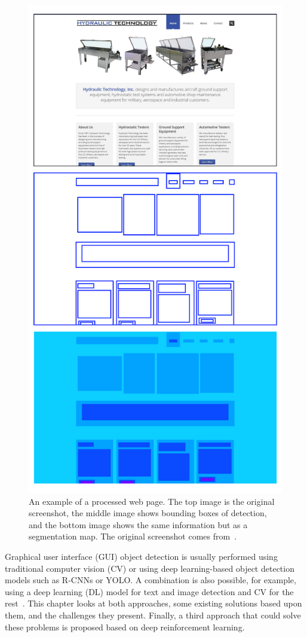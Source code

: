 \documentclass[
  digital,     %
  oneside,     %
  nosansbold,  %
  nocolorbold, %
  lof,         %
  lot,         %
]{fithesis4}
\begin{document}
\begin{figure}
    \centering
    \includegraphics[width=0.7\linewidth]{diagrams/result_example.pdf}
    \caption{An example of a processed web page. The top image is the original screenshot, the middle image shows bounding boxes of detection, and the bottom image shows the same information but as a segmentation map. The original screenshot comes from~\cite{aydos2020}.}
    \label{fig:example-result}
\end{figure}

Graphical user interface (GUI) object detection is usually performed using traditional computer vision (CV) or using deep learning-based object detection models such as R-CNNs or YOLO. A combination is also possible, for example, using a deep learning (DL) model for text and image detection and CV for the rest~\cite{ODforGUI_CV_DL_or_both}. This chapter looks at both approaches, some existing solutions based upon them, and the challenges they present. Finally, a third approach that could solve these problems is proposed based on deep reinforcement learning.
\end{document}

